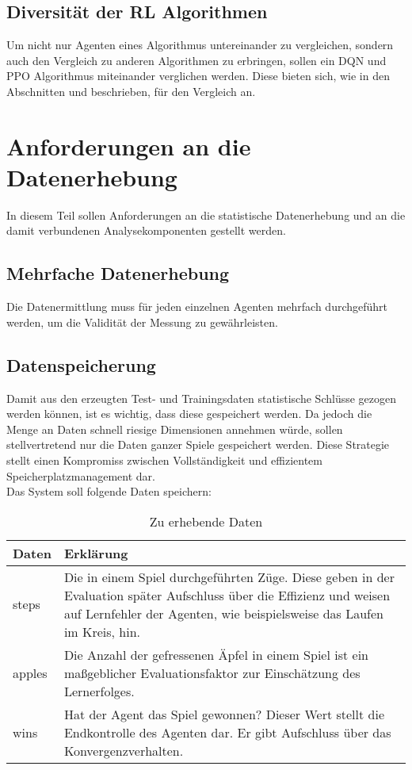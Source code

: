\subsection{Diversität der RL Algorithmen} \label{subsec:Anforderungen_Diversität}
Um nicht nur Agenten eines Algorithmus untereinander zu vergleichen, sondern auch den Vergleich zu anderen Algorithmen zu erbringen, sollen ein DQN und PPO Algorithmus miteinander verglichen werden. 
Diese bieten sich, wie in den Abschnitten  und  beschrieben, für den Vergleich an.

\section{Anforderungen an die Datenerhebung} \label{sec:Anforderungen_an_die_Datenerhebung}
In diesem Teil sollen Anforderungen an die statistische Datenerhebung und an die damit verbundenen Analysekomponenten gestellt werden.

\subsection{Mehrfache Datenerhebung} \label{subsec:Anforderungen_mehrfache_Datenerhebung}
Die Datenermittlung muss für jeden einzelnen Agenten mehrfach durchgeführt werden, um die Validität der Messung zu gewährleisten. \citep[S. 135]{DL}

\subsection{Datenspeicherung} \label{subsec:Anforderungen_Datenspeicherung}
Damit aus den erzeugten Test- und Trainingsdaten statistische Schlüsse gezogen werden können, ist es wichtig, dass diese gespeichert werden. Da jedoch die Menge an Daten schnell riesige Dimensionen annehmen würde, sollen stellvertretend nur die Daten ganzer Spiele gespeichert werden. Diese Strategie stellt einen Kompromiss zwischen Vollständigkeit und effizientem Speicherplatzmanagement dar.\\
Das System soll folgende Daten speichern:
\begin{longtable}[h]{|p{4cm}|p{\linewidth - 5cm}|}
	\caption{Zu erhebende Daten}
	\label{tab:Anforderungen_Datenerhebung} 
	\endfirsthead
	\endhead
	\hline
	Daten & Erklärung \\
	\hline
	steps & Die in einem Spiel durchgeführten Züge. Diese geben in der Evaluation später Aufschluss über die Effizienz und weisen auf Lernfehler der Agenten, wie beispielsweise das Laufen im Kreis, hin.\\
	\hline
	apples & Die Anzahl der gefressenen Äpfel in einem Spiel ist ein maßgeblicher Evaluationsfaktor zur Einschätzung des Lernerfolges.\\
	\hline
	wins & Hat der Agent das Spiel gewonnen? Dieser Wert stellt die Endkontrolle des Agenten dar. Er gibt Aufschluss über das Konvergenzverhalten.\\
	\hline
\end{longtable}

